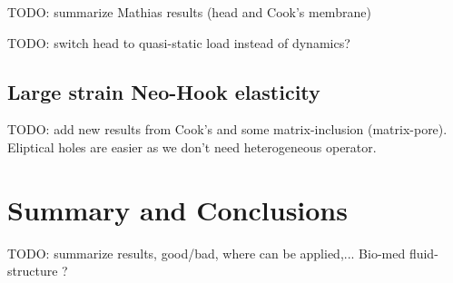 \documentclass[preprint,12pt,times]{elsarticle}
\begin{document}
TODO: summarize Mathias results (head and Cook's membrane)

TODO: switch head to quasi-static load instead of dynamics?

\subsection{Large strain Neo-Hook elasticity}

TODO: add new results from Cook's and some matrix-inclusion (matrix-pore).
Eliptical holes are easier as we don't need heterogeneous operator.

\section{Summary and Conclusions}

TODO: summarize results, good/bad, where can be applied,...
Bio-med fluid-structure ?



\end{document}
